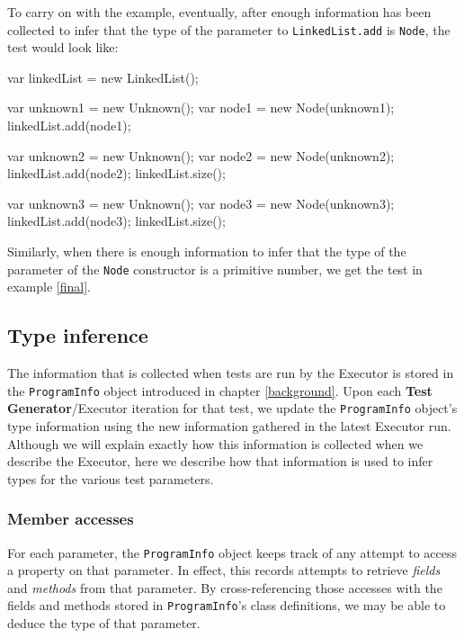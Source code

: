 To carry on with the example, eventually, after enough information has been collected to infer that the type of the parameter to \texttt{LinkedList.add} is \texttt{Node}, the test would look like:

\begin{code}[caption=After type inference for \texttt{LinkedList.add}, label=firstinference]
   var linkedList = new LinkedList();
   
   var unknown1 = new Unknown();
   var node1 = new Node(unknown1);
   linkedList.add(node1);
   
   var unknown2 = new Unknown();
   var node2 = new Node(unknown2);
   linkedList.add(node2);
   linkedList.size();

   var unknown3 = new Unknown();
   var node3 = new Node(unknown3);
   linkedList.add(node3);
   linkedList.size();
\end{code}

Similarly, when there is enough information to infer that the type of the parameter of the \texttt{Node} constructor is a primitive number, we get the test in example \ref{final}.

\subsection{Type inference}
The information that is collected when tests are run by the \textsf{Executor} is stored in the \texttt{ProgramInfo} object introduced in chapter \ref{background}. Upon each \textbf{Test Generator}/\textsf{Executor} iteration for that test, we update the \texttt{ProgramInfo} object's type information using the new information gathered in the latest \textsf{Executor} run. Although we will explain exactly how this information is collected when we describe the \textsf{Executor}, here we describe how that information is used to infer types for the various test parameters.

\subsubsection{Member accesses}
For each parameter, the \texttt{ProgramInfo} object keeps track of any attempt to access a property on that parameter. In effect, this records attempts to retrieve \emph{fields} and \emph{methods} from that parameter. By cross-referencing those accesses with the fields and methods stored in \texttt{ProgramInfo}'s class definitions, we may be able to deduce the type of that parameter. 

